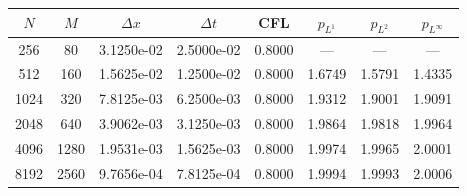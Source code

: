 \begin{tabular}{cccccccc}
\toprule
$N$ & $M$ & $\Delta x$ & $\Delta t$ & CFL & $p_{L^1}$ & $p_{L^2}$ & $p_{L^\infty}$ \\
\midrule
256 & 80 & 3.1250e-02 & 2.5000e-02 & 0.8000 & --- & --- & --- \\
512 & 160 & 1.5625e-02 & 1.2500e-02 & 0.8000 & 1.6749 & 1.5791 & 1.4335 \\
1024 & 320 & 7.8125e-03 & 6.2500e-03 & 0.8000 & 1.9312 & 1.9001 & 1.9091 \\
2048 & 640 & 3.9062e-03 & 3.1250e-03 & 0.8000 & 1.9864 & 1.9818 & 1.9964 \\
4096 & 1280 & 1.9531e-03 & 1.5625e-03 & 0.8000 & 1.9974 & 1.9965 & 2.0001 \\
8192 & 2560 & 9.7656e-04 & 7.8125e-04 & 0.8000 & 1.9994 & 1.9993 & 2.0006 \\
\bottomrule
\end{tabular}